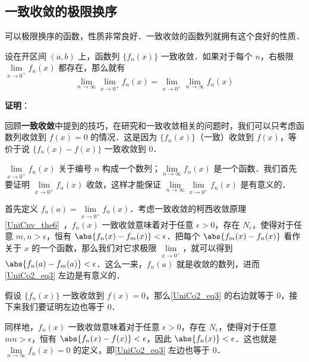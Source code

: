 \subsection{一致收敛的极限换序}

可以极限换序的函数，性质非常良好．一致收敛的函数列就拥有这个良好的性质．

\begin{theorem}{}\label{UniCo2_the1}
设在开区间 $(a, b)$ 上，函数列 $\{f_n(x)\}$ 一致收敛．如果对于每个 $n$，右极限 $\lim\limits_{x\to 0^+}f_n(x)$ 都存在，那么就有
\begin{equation}\label{UniCo2_eq3}
\lim\limits_{n\to\infty}\lim\limits_{x\to 0^+}f_n(x)=\lim\limits_{x\to 0^+}\lim\limits_{n\to\infty}f_n(x)
\end{equation}
\end{theorem}

\textbf{证明}：

回顾\textbf{一致收敛}中提到的技巧，在研究和一致收敛相关的问题时，我们可以只考虑函数列收敛到 $f(x)=0$ 的情况．这是因为 $\{f_n(x)\}$（一致）收敛到 $f(x)$，等价于说 $\{f_n(x)-f(x)\}$ 一致收敛到 $0$．

$\lim\limits_{x\to 0^+}f_n(x)$ 关于编号 $n$ 构成一个数列；$\lim\limits_{n\to\infty}f_n(x)$ 是一个函数．我们首先要证明 $\lim\limits_{x\to 0^+}f_n(x)$ 收敛，这样才能保证 $\lim\limits_{n\to\infty}\lim\limits_{x\to 0^+}f_n(x)$ 是有意义的．

首先定义 $f_n(a)=\lim\limits_{x\to 0^+}f_n(x)$．考虑一致收敛的柯西收敛原理\autoref{UniCnv_the6}~，$f_n(x)$ 一致收敛意味着对于任意 $\epsilon>0$，存在 $N_\epsilon$，使得对于任意 $m, n>\epsilon$，恒有 $\abs{f_n(x)-f_m(x)}<\epsilon$．把每个 $\abs{f_m(x)-f_n(x)}$ 看作关于 $x$ 的一个函数，那么我们对它求极限 $\lim\limits_{x\to 0^+}$，就可以得到 $\abs{f_n(a)-f_m(a)}<\epsilon$．这么一来，$f_n(a)$ 就是收敛的数列，进而\autoref{UniCo2_eq3} 左边是有意义的．

假设 $\{f_n(x)\}$ 一致收敛到 $f(x)=0$，那么\autoref{UniCo2_eq3} 的右边就等于 $0$，接下来我们要证明左边也等于 $0$．

同样地，$f_n(x)$ 一致收敛意味着对于任意 $\epsilon>0$，存在 $N_\epsilon$，使得对于任意 $mn>\epsilon$，恒有 $\abs{f_n(x)-f(x)}<\epsilon$，因此 $\abs{f_n(x)}<\epsilon$．这也就是 $\lim\limits_{n\to\infty}f_n(x)=0$ 的定义，即\autoref{UniCo2_eq3} 左边也等于 $0$．


